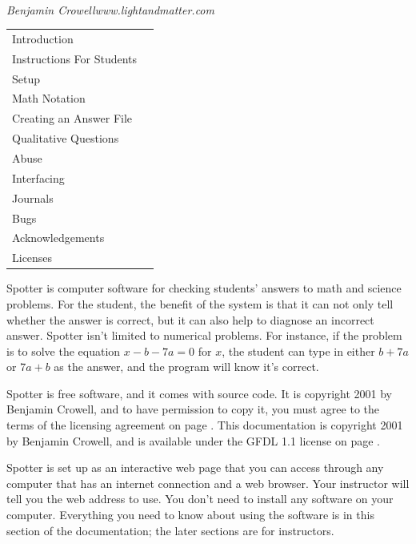 \documentclass{doc}
\begin{document}
\parafmt
{} \\
\emph{Benjamin Crowell}\hfill{}\emph{www.lightandmatter.com}

\vspace{8mm}


\noindent\large\begin{tabular}{ll}
\hline
Introduction	& \pageref{intro} \\
Instructions For Students  &  \pageref{studentinstructions}\\
Setup  &  \pageref{setup}\\
Math Notation  &  \pageref{mathnotation}\\
Creating an Answer File & \pageref{answerfile}\\
Qualitative Questions & \pageref{qualitative}\\
Abuse & \pageref{abuse}\\
Interfacing & \pageref{interfacing}\\
Journals & \pageref{journals}\\
Bugs  &  \pageref{bugs}\\
Acknowledgements  &  \pageref{acknowledgements}\\
Licenses  &  \pageref{license}\\
\hline
\end{tabular}\normalsize


\label{intro}
Spotter is computer software for checking students' answers
to math and science problems. For the student, the benefit of
the system is that it can not only tell whether the answer is
correct, but it can also help to diagnose an incorrect answer.
Spotter isn't limited to numerical problems. For instance,
if the problem is to solve the equation $x-b-7a=0$ for $x$,
the student can type in either $b+7a$ or $7a+b$ as the answer,
and the program will know it's correct.

Spotter is free software, and it comes with source code. It is
copyright 2001 by Benjamin Crowell, and to have permission to copy it, you must agree
to the terms of the licensing agreement on page
\pageref{license}. This documentation is copyright 2001 by
Benjamin Crowell, and is available under the GFDL 1.1 license
on page \pageref{gfdl}.

\label{studentinstructions}
Spotter is set up as an interactive web page that you can access
through any computer that has an internet connection and a
web browser. Your instructor will tell you the web address to
use. You don't need to install any software on your computer.
Everything you need to know about using the software is in this
section of the documentation; the later sections are for instructors.
\end{document}
